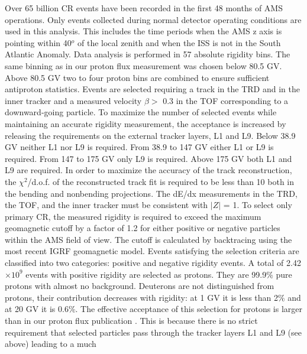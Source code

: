 \documentclass[twocolumn,twoside,slac_two]{revtex4-1}
\begin{document}
Over 65 billion
CR events have been recorded in the first 48 months
of AMS operations. Only events collected during normal
detector operating conditions are used in this analysis. This
includes the time periods when the AMS z axis is pointing
within 40$^o$ of the local zenith and when the ISS is not in the
South Atlantic Anomaly. Data analysis is performed in 57
absolute rigidity bins. The same binning as in our proton
flux measurement \cite{ref:AMS2_protons}
was chosen below 80.5 GV. Above
80.5 GV two to four proton bins are combined to
ensure sufficient antiproton statistics.
Events are selected requiring a track in the TRD and in
the inner tracker and a measured velocity $\beta >$ 0.3 in the
TOF corresponding to a downward-going particle. To
maximize the number of selected events while maintaining
an accurate rigidity measurement, the acceptance is
increased by releasing the requirements on the external
tracker layers, L1 and L9. Below 38.9 GV neither L1 nor
L9 is required. From 38.9 to 147 GV either L1 or L9 is
required. From 147 to 175 GV only L9 is required. Above
175 GV both L1 and L9 are required. In order to maximize
the accuracy of the track reconstruction, the  $\chi^2$/d.o.f. of the
reconstructed track fit is required to be less than 10 both in
the bending and nonbending projections. The dE/dx
measurements in the TRD, the TOF, and the inner tracker
must be consistent with $\vert Z \vert$ = 1. To select only primary
CR, the measured rigidity is required to exceed the
maximum geomagnetic cutoff by a factor of 1.2 for either
positive or negative particles within the AMS field of view.
The cutoff is calculated by backtracing using the
most recent IGRF geomagnetic model.
Events satisfying the selection criteria are classified into
two categories: positive and negative rigidity events. A
total of 2.42 $\times 10^9$ events with positive rigidity are selected
as protons. They are 99.9$\%$ pure protons with almost no
background. Deuterons are not distinguished from protons,
their contribution decreases with rigidity: at 1 GV it is less
than 2$\%$ and at 20 GV it is 0.6$\%$. The effective
acceptance of this selection for protons is larger than in our
proton flux publication \cite{ref:AMS2_protons}.
This is because there is no
strict requirement that selected particles pass through the
tracker layers L1 and L9 (see above) leading to a much
\end{document}
